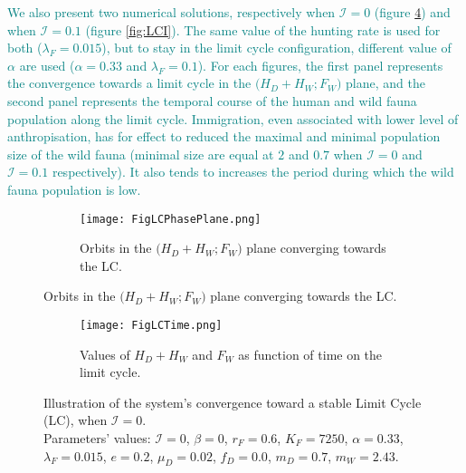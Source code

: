 \documentclass{article}
\newcommand{\lfw}{\lambda_{F}}
\newcommand{\lfw}{\lambda_{F}}
\newcommand{\cI}{\mathcal{I}}
\newcommand{\vquatre}[1]{\textcolor{teal}{#1}}
\theoremstyle{definition}
\theoremstyle{remark}
\begin{document}
\vquatre{
We also present two numerical solutions, respectively when $\cI = 0$ (figure \ref{fig:LCI0}) and when $\cI = 0.1$ (figure \ref{fig:LCI}). The same value of the hunting rate is used for both ($\lfw = 0.015$), but to stay in the limit cycle configuration, different value of $\alpha$ are used ($\alpha = 0.33$ and $\lfw = 0.1$).
}
\vquatre{ 
For each figures, the first panel represents the convergence towards a limit cycle in the $\Big(H_D+H_W; F_W\Big)$ plane, and the second panel represents the temporal course of the human and wild fauna population along the limit cycle. 
}
\vquatre{
Immigration, even associated with lower level of anthropisation, has for effect to reduced the maximal and minimal population size of the wild fauna (minimal size are equal at $2$ and $0.7$ when $\cI = 0$ and $\cI = 0.1$ respectively). It also tends to increases the period during which the wild fauna population is low. 
}

\begin{figure}[!ht]
\begin{subfigure}{1\textwidth}
\centering
\texttt{[image: FigLCPhasePlane.png]}
\caption{\centering Orbits in the $\Big(H_D + H_W ; F_W\Big)$ plane converging towards the LC.}
\label{fig:LCI0, 1}
\end{subfigure}
\end{figure}
\begin{figure}
\ContinuedFloat
\begin{subfigure}{1\textwidth}
\centering
\texttt{[image: FigLCTime.png]}
\caption{\centering Values of $H_D + H_W$ and $F_W$ as function of time on the limit cycle.}
\label{fig:LCI0, 2}
\end{subfigure}
\caption{Illustration of the system's convergence toward a stable Limit Cycle (LC), when $\cI =0$. \\
Parameters' values: $\cI = 0$, $\beta = 0$, $r_F = 0.6$, $K_F = 7250$, $\alpha = 0.33$, $\lfw = 0.015$, $e = 0.2$, $\mu_D = 0.02$, $f_D = 0.0$, $m_D = 0.7$, $m_W = 2.43$.}
\label{fig:LCI0}
\end{figure}
\end{document}
